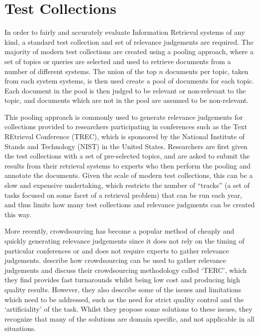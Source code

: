 \section{Test Collections}
\label{background:sec:collections}
In order to fairly and accurately evaluate Information Retrieval systems of any kind, a standard test collection and set of relevance judgements are required.
The majority of modern test collections are created using a pooling approach, where a set of topics or queries are selected and used to retrieve documents from a number of different systems.
The union of the top \(n\) documents per topic, taken from each system systems, is then used create a pool of documents for each topic.
Each document in the pool is then judged to be relevant or non-relevant to the topic, and documents which are not in the pool are assumed to be non-relevant.

This pooling  approach is commonly used to generate relevance judgements for collections provided to researchers participating in conferences such as the Text REtrieval Conference (TREC), which is sponsored by the National Institute of Stands and Technology (NIST) in the United States.
Researchers are first given the test collections with a set of pre-selected topics, and are asked to submit the results from their retrieval systems to experts who then perform the pooling and annotate the documents.
Given the scale of modern test collections, this can be a slow and expensive undertaking, which restricts the number of ``tracks'' (a set of tasks focused on some facet of a retrieval problem) that can be run each year, and thus limits how many test collections and relevance judgments can be created this way.

More recently, crowdsourcing has become a popular method of cheaply and quickly generating relevance judgements since it does not rely on the timing of particular conferences or and does not require experts to gather relevance judgements.
\cite{Alonso:2008:CRE:1480506.1480508} describe how crowdsourcing can be used to gather relevance judgements and discuss their crowdsourcing methodology called `TERC', which they find provides fast turnarounds whilst being low cost and producing high quality results.
However, they also describe some of the issues and limitations which need to be addressed, such as the need for strict quality control and the `artificiality' of the task.
Whilst they propose some solutions to these issues, they recognize that many of the solutions are domain specific, and not applicable in all situations.

